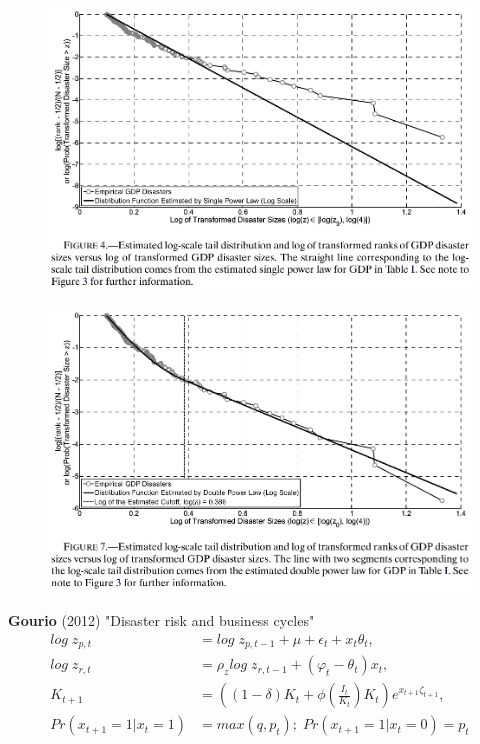 \documentclass{beamer}
\begin{document}
\begin{frame}
  \begin{figure}
    \includegraphics[scale=.7]{barro_jin3.eps}
  \end{figure}
\end{frame}

\begin{frame}
  \begin{figure}
    \includegraphics[scale=.7]{barro_jin4.eps}
  \end{figure}
\end{frame}


\begin{frame}
 \textbf{Gourio} (2012) "Disaster risk and business cycles"\\
 \begin{align}
   log\;z_{p,t}&= log\; z_{p,t-1} + \mu + \epsilon_t +x_t\theta_t, \\
   log\; z_{r,t} &= \rho_z log\; z_{r,t-1} + (\varphi_t-\theta_t)x_t,\\
   K_{t+1} &= \left( (1-\delta)K_t + \phi \left(\frac{I_t}{K_t}\right)K_t \right) e^{x_{t+1}\zeta_{t+1}}, \\
   Pr(x_{t+1}=1 | x_t=1) &= max(q,p_t);\; Pr(x_{t+1}=1 | x_t=0) = p_t
 \end{align}
\end{frame}
\end{document}
